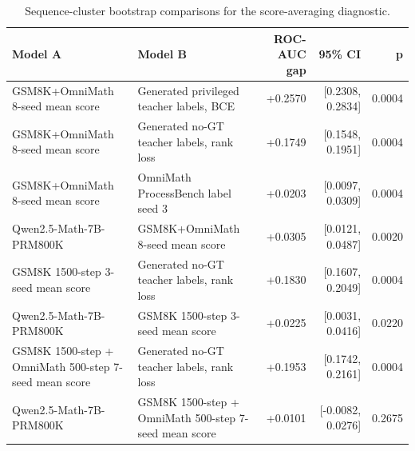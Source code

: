 \begin{table}[t]
\centering
\small
\begin{tabular}{llrrr}
\toprule
Model A & Model B & ROC-AUC gap & 95\% CI & p \\
\midrule
GSM8K+OmniMath 8-seed mean score & Generated privileged teacher labels, BCE & +0.2570 & [0.2308, 0.2834] & 0.0004 \\
GSM8K+OmniMath 8-seed mean score & Generated no-GT teacher labels, rank loss & +0.1749 & [0.1548, 0.1951] & 0.0004 \\
GSM8K+OmniMath 8-seed mean score & OmniMath ProcessBench label seed 3 & +0.0203 & [0.0097, 0.0309] & 0.0004 \\
Qwen2.5-Math-7B-PRM800K & GSM8K+OmniMath 8-seed mean score & +0.0305 & [0.0121, 0.0487] & 0.0020 \\
GSM8K 1500-step 3-seed mean score & Generated no-GT teacher labels, rank loss & +0.1830 & [0.1607, 0.2049] & 0.0004 \\
Qwen2.5-Math-7B-PRM800K & GSM8K 1500-step 3-seed mean score & +0.0225 & [0.0031, 0.0416] & 0.0220 \\
GSM8K 1500-step + OmniMath 500-step 7-seed mean score & Generated no-GT teacher labels, rank loss & +0.1953 & [0.1742, 0.2161] & 0.0004 \\
Qwen2.5-Math-7B-PRM800K & GSM8K 1500-step + OmniMath 500-step 7-seed mean score & +0.0101 & [-0.0082, 0.0276] & 0.2675 \\
\bottomrule
\end{tabular}
\caption{Sequence-cluster bootstrap comparisons for the score-averaging diagnostic.}
\label{tab:phase-b-score-ensemble-ci}
\end{table}
